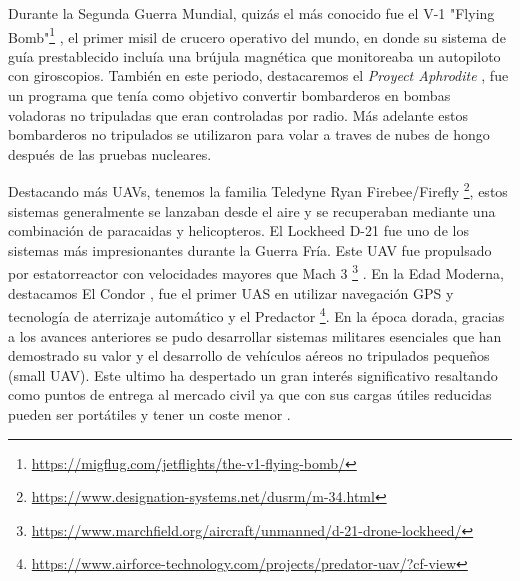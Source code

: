 Durante la Segunda Guerra Mundial, quizás el más conocido fue el V-1 "Flying Bomb"\footnote{\url{https://migflug.com/jetflights/the-v1-flying-bomb/}} , el primer misil
de crucero operativo del mundo, en donde su sistema de guía prestablecido incluía una brújula magnética que monitoreaba un autopiloto con giroscopios. También en este periodo, destacaremos el \textit{Proyect Aphrodite} \cite{Aphrodite}, fue un programa que tenía como objetivo convertir bombarderos en bombas voladoras no tripuladas que eran controladas por radio. Más adelante estos bombarderos no tripulados se utilizaron para volar a traves de nubes de hongo
después de las pruebas nucleares. \newline

Destacando más UAVs, tenemos la familia Teledyne Ryan Firebee/Firefly \footnote{\url{https://www.designation-systems.net/dusrm/m-34.html}}, estos sistemas generalmente se lanzaban 
desde el aire y se recuperaban mediante una combinación de paracaidas y helicopteros. El Lockheed D-21 fue uno de los sistemas más impresionantes durante la Guerra Fría. 
Este UAV fue propulsado por estatorreactor con velocidades mayores que Mach 3 \footnote{\url{https://www.marchfield.org/aircraft/unmanned/d-21-drone-lockheed/}} . 
En la Edad Moderna, destacamos El Condor \cite{CondorUAV}, fue el primer UAS en utilizar navegación GPS y tecnología de aterrizaje automático y el Predactor \footnote{\url{https://www.airforce-technology.com/projects/predator-uav/?cf-view}}. 
En la época dorada, gracias a los avances anteriores se pudo desarrollar sistemas militares esenciales que han demostrado su valor y el desarrollo de vehículos aéreos no 
tripulados pequeños (small UAV). Este ultimo ha despertado un gran interés significativo resaltando como puntos de entrega al mercado civil ya que con sus cargas útiles
reducidas pueden ser portátiles y tener un coste menor . \newline

